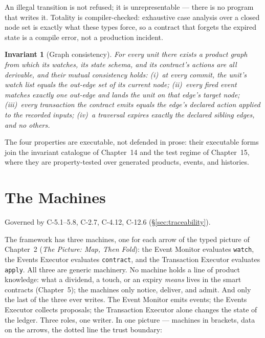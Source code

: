 \documentclass[11pt,a4paper]{article}
\newtheorem{invariant}[definition]{Invariant}
\begin{document}
An illegal transition is not refused; it is unrepresentable --- there is no program that
writes it. Totality is compiler-checked: exhaustive case analysis over a closed node set
is exactly what these types force, so a contract that forgets the expired state is a
compile error, not a production incident.

\begin{invariant}[Graph consistency]\label{inv:graph-consistency}
For every unit there exists a product graph from which its watches, its state schema,
and its contract's actions are all derivable, and their mutual consistency holds:
(i)~at every commit, the unit's watch list equals the out-edge set of its current node;
(ii)~every fired event matches exactly one out-edge and lands the unit on that edge's
target node;
(iii)~every transaction the contract emits equals the edge's declared action applied to
the recorded inputs;
(iv)~a traversal expires exactly the declared sibling edges, and no others.
\end{invariant}

The four properties are executable, not defended in prose: their executable forms join
the invariant catalogue of Chapter~14 and the test regime of Chapter~15, where they are
property-tested over generated products, events, and histories.


\section{The Machines}\label{ch:machines}

Governed by C-5.1--5.8, C-2.7, C-4.12, C-12.6 (\S\ref{sec:traceability}).

The framework has three machines, one for each arrow of the typed picture of
Chapter~2 (\emph{The Picture: Map, Then Fold}): the Event Monitor evaluates
\texttt{watch}, the Events Executor evaluates \texttt{contract}, and the
Transaction Executor evaluates \texttt{apply}. All three are generic machinery.
No machine holds a line of product knowledge: what a dividend, a touch, or an
expiry \emph{means} lives in the smart contracts (Chapter~5); the machines only
notice, deliver, and admit. And only the last of the three ever writes. The
Event Monitor emits events; the Events Executor collects proposals; the
Transaction Executor alone changes the state of the ledger. Three roles, one
writer. In one picture --- machines in brackets, data on the arrows, the dotted
line the trust boundary:
\end{document}
